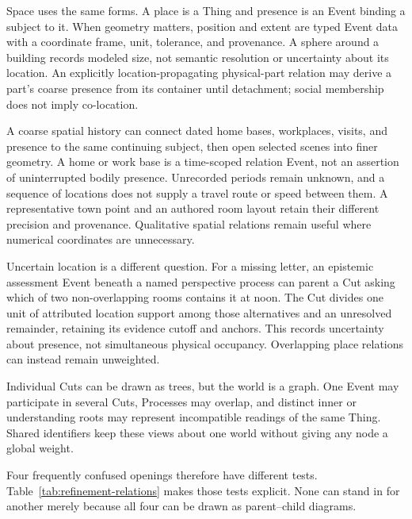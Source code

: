 \documentclass[11pt,a4paper]{article}
\begin{document}
Space uses the same forms. A place is a Thing and presence is an Event binding a
subject to it. When geometry matters, position and extent are typed Event data
with a coordinate frame, unit, tolerance, and provenance. A sphere around a
building records modeled size, not semantic resolution or uncertainty about its
location. An explicitly location-propagating physical-part relation may derive
a part's coarse presence from its container until detachment; social membership
does not imply co-location.

A coarse spatial history can connect dated home bases, workplaces, visits, and
presence to the same continuing subject, then open selected scenes into finer
geometry. A home or work base is a time-scoped relation Event, not an assertion
of uninterrupted bodily presence.
Unrecorded periods remain unknown, and a sequence of locations does not supply
a travel route or speed between them. A representative town point and an
authored room layout retain their different precision and provenance. Qualitative
spatial relations remain useful where numerical coordinates are unnecessary.

Uncertain location is a different question. For a missing letter, an epistemic
assessment Event beneath a named perspective process can parent a Cut asking
which of two non-overlapping rooms contains it at noon. The Cut divides one
unit of attributed location support among those alternatives and an unresolved
remainder, retaining its evidence cutoff and anchors. This records uncertainty
about presence, not simultaneous physical occupancy. Overlapping place
relations can instead remain unweighted.

Individual Cuts can be drawn as trees, but the world is a graph. One Event may
participate in several Cuts, Processes may overlap, and distinct inner or
understanding roots may represent incompatible readings of the same Thing.
Shared identifiers keep these views about one world without giving any node a
global weight.

Four frequently confused openings therefore have different tests.
Table~\ref{tab:refinement-relations} makes those tests explicit. None can stand
in for another merely because all four can be drawn as parent--child diagrams.
\end{document}
